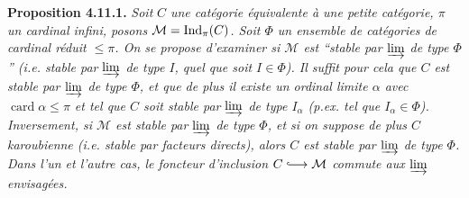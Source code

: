 \textbf{Proposition 4.11.1.} \textit{Soit}  \textit{$C$ une catégorie équivalente à une petite catégorie, $\pi$ un cardinal infini, posons $\mathcal{M} = \mathrm{Ind}_\pi(C)$. Soit $\Phi$ un ensemble de catégories de cardinal réduit $\leqslant \pi$. On se propose d'examiner si $\mathcal{M}$ est “stable par $\varinjlim$ de type $\Phi$” (i.e. stable par $\varinjlim$ de type $I$, quel que soit $I \in \Phi$). Il suffit pour cela que $C$ est stable par $\varinjlim$ de type $\Phi$, et que de plus il existe un ordinal limite $\alpha$ avec $\operatorname{card}\alpha \leqslant \pi$ et tel que $C$ soit stable par $\varinjlim$ de type $I_\alpha$ (p.ex. tel que $I_\alpha \in \Phi$). Inversement, si $\mathcal{M}$ est stable par $\varinjlim$ de type $\Phi$, et si on suppose de plus $C$ karoubienne (i.e. stable par facteurs directs), alors $C$ est stable par $\varinjlim$ de type $\Phi$. Dans l'un et l'autre cas, le foncteur d'inclusion $C \into \mathcal{M}$ commute aux $\varinjlim$ envisagées.}

